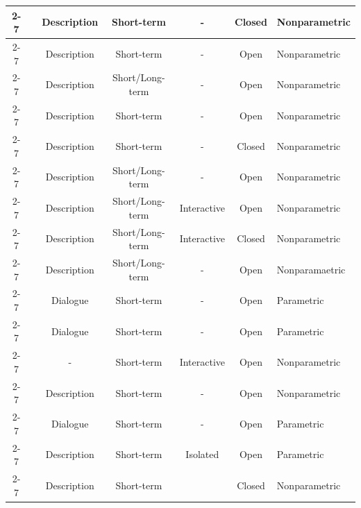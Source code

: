 \begin{table}[!htp]
\begin{tabularx}{\linewidth}{c|>{\centering\arraybackslash}X|c|c|c|c|>{\centering\arraybackslash}m{8em}}
		\cmidrule{2-7}
		& \cite{song2023largelanguagemodelsdeveloped} & Description & Short-term & - & Closed  & Nonparametric  \\
		\cmidrule{2-7}
		& \cite{cheng2023markedpersonasusingnatural} & Description & Short-term & - & Open  & Nonparametric  \\
		\cmidrule{2-7}
		& \cite{wang2024userbehaviorsimulationlarge} & Description & Short/Long-term & - & Open  & Nonparametric  \\
		\cmidrule{2-7}
		& \cite{serapiogarcía2023personalitytraitslargelanguage} & Description & Short-term & - & Open  & Nonparametric  \\
		\cmidrule{2-7}
		& \cite{huang2024emotionallynumbempatheticevaluating} & Description & Short-term & - & Closed  & Nonparametric  \\
		\cmidrule{2-7}
		& \cite{tu2023characterchatlearningconversationalai} & Description & Short/Long-term & - & Open  & Nonparametric  \\
		\cmidrule{2-7}
		& \cite{abbasian2024conversationalhealthagentspersonalized} & Description & Short/Long-term & Interactive & Open  & Nonparametric  \\
		\cmidrule{2-7}
		& \cite{chen2024moneymouthisevaluating} & Description & Short/Long-term & Interactive & Closed  & Nonparametric  \\
		\cmidrule{2-7}
		& \cite{li2024econagentlargelanguagemodelempowered} & Description & Short/Long-term & - & Open  & Nonparamaetric  \\
		\cmidrule{2-7}
		& \cite{shea2023buildingpersonaconsistentdialogue} & Dialogue & Short-term & - & Open  & Parametric  \\
		\cmidrule{2-7}
		& \cite{chawla2023selfishwiselyinvestigatingimpact} & Dialogue & Short-term & - & Open  & Parametric  \\
		\cmidrule{2-7}
		& \cite{10.19066/COGSCI.2024.35.1.002} & - & Short-term & Interactive & Open  & Nonparametric  \\
		\cmidrule{2-7}
		& \cite{gupta2024biasrunsdeepimplicit} & Description & Short-term & - & Open  & Nonparametric  \\
		\cmidrule{2-7}
		& \cite{li2024steerabilitylargelanguagemodels} & Dialogue & Short-term & - & Open  & Parametric  \\
		\cmidrule{2-7}
		& \cite{huang2024embodiedgeneralistagent3d} & Description & Short-term & Isolated & Open  & Parametric  \\
		\cmidrule{2-7}
		& \cite{xie2024largelanguagemodelagents} & Description & Short-term &  & Closed  & Nonparametric  \\

\end{tabularx}
\end{table}
